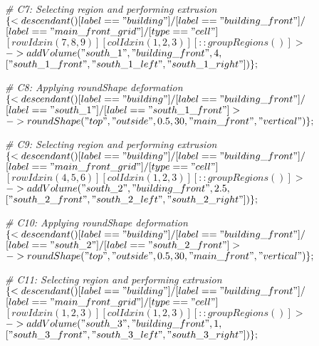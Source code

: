 \noindent \textit{\# C7: Selecting region and performing extrusion}\\
$\{< descendant() [label=="building"] / [label=="building\_front"] / $\\
$[label=="main\_front\_grid"] / [type=="cell"] $\\
$[rowIdx in (7, 8, 9)] [colIdx in (1, 2, 3)] [::groupRegions()] > $\\
$-> addVolume("south\_1", "building\_front", 4, $\\
$["south\_1\_front", "south\_1\_left", "south\_1\_right"])\};$

\noindent \textit{\# C8: Applying roundShape deformation}\\
$\{< descendant() [label=="building"] / [label=="building\_front"] / $\\
$[label=="south\_1"] / [label=="south\_1\_front"] > $\\
$-> roundShape("top", "outside", 0.5, 30, "main\_front", "vertical")\};$

\noindent \textit{\# C9: Selecting region and performing extrusion}\\
$\{< descendant() [label=="building"] / [label=="building\_front"] / $\\
$[label=="main\_front\_grid"] / [type=="cell"] $\\
$[rowIdx in (4, 5, 6)] [colIdx in (1, 2, 3)] [::groupRegions()] > $\\
$-> addVolume("south\_2", "building\_front", 2.5, $\\
$["south\_2\_front", "south\_2\_left", "south\_2\_right"])\};$

\noindent \textit{\# C10: Applying roundShape deformation}\\
$\{< descendant() [label=="building"] / [label=="building\_front"] / $\\
$[label=="south\_2"] / [label=="south\_2\_front"] > $\\
$-> roundShape("top", "outside", 0.5, 30, "main\_front", "vertical")\};$

\noindent \textit{\# C11: Selecting region and performing extrusion}\\
$\{< descendant() [label=="building"] / [label=="building\_front"] / $\\
$[label=="main\_front\_grid"] / [type=="cell"] $\\
$[rowIdx in (1, 2, 3)] [colIdx in (1, 2, 3)] [::groupRegions()] > $\\
$-> addVolume("south\_3", "building\_front", 1, $\\
$["south\_3\_front", "south\_3\_left", "south\_3\_right"])\};$

